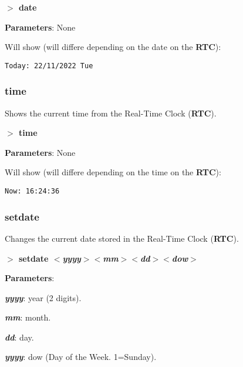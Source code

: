         \hspace{1.9cm}\textbf{$>$ date}

        \textbf{Parameters}: None

        Will show (will differe depending on the date on the \textbf{RTC}):

        \hspace{1cm}\texttt{Today:\ 22/11/2022 Tue}

        \subsubsection{{time}}
        Shows the current time from the Real-Time Clock (\textbf{RTC}).

        \hspace{1.9cm}\textbf{$>$ time}

        \textbf{Parameters}: None

        Will show (will differe depending on the time on the \textbf{RTC}):

        \hspace{1cm}\texttt{Now:\ 16:24:36}

        \subsubsection{{setdate}}
        Changes the current date stored in the Real-Time Clock (\textbf{RTC}).

        \hspace{1.9cm}\textbf{$>$ setdate \textit{$<$yyyy$>$$<$mm$>$$<$dd$>$$<$dow$>$}}

        \textbf{Parameters}:

        \hspace{1cm}\textbf{\textit{yyyy}}: year (2 digits).

        \hspace{1cm}\textbf{\textit{mm}}: month.

        \hspace{1cm}\textbf{\textit{dd}}: day.

        \hspace{1cm}\textbf{\textit{yyyy}}: dow (Day of the Week. 1=Sunday).

